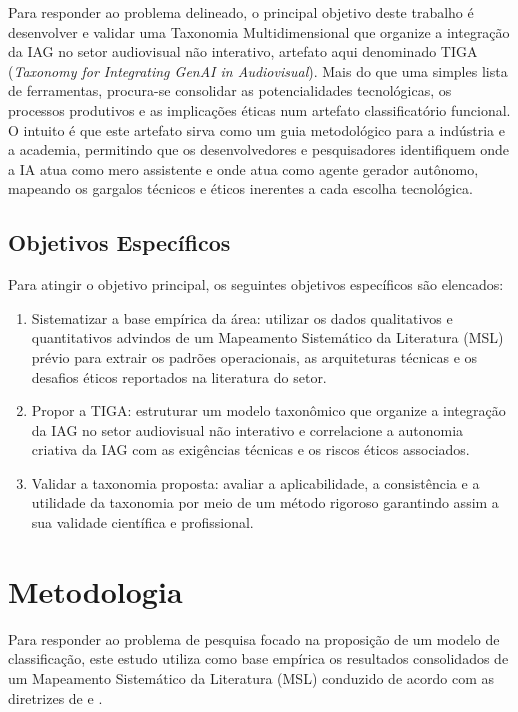 Para responder ao problema delineado, o principal objetivo deste trabalho é desenvolver e validar uma Taxonomia Multidimensional que organize a integração da IAG no setor audiovisual não interativo, artefato aqui denominado TIGA (\textit{Taxonomy for Integrating GenAI in Audiovisual}). Mais do que uma simples lista de ferramentas, procura-se consolidar as potencialidades tecnológicas, os processos produtivos e as implicações éticas num artefato classificatório funcional. O intuito é que este artefato sirva como um guia metodológico para a indústria e a academia, permitindo que os desenvolvedores e pesquisadores identifiquem onde a IA atua como mero assistente e onde atua como agente gerador autônomo, mapeando os gargalos técnicos e éticos inerentes a cada escolha tecnológica.

\subsection{Objetivos Específicos}
\label{subsec:intro:objetivos_especificos}

Para atingir o objetivo principal, os seguintes objetivos específicos são elencados:

\begin{enumerate}
    \item Sistematizar a base empírica da área: utilizar os dados qualitativos e quantitativos advindos de um Mapeamento Sistemático da Literatura (MSL) prévio \citep{RothAleo2026} para extrair os padrões operacionais, as arquiteturas técnicas e os desafios éticos reportados na literatura do setor.
    
    \item Propor a TIGA: estruturar um modelo taxonômico que organize a integração da IAG no setor audiovisual não interativo e correlacione a autonomia criativa da IAG com as exigências técnicas e os riscos éticos associados.
    
    \item Validar a taxonomia proposta: avaliar a aplicabilidade, a consistência e a utilidade da taxonomia por meio de um método rigoroso garantindo assim a sua validade científica e profissional.
\end{enumerate}

\section{Metodologia}
\label{sec:intro:metodologia}

Para responder ao problema de pesquisa focado na proposição de um modelo de classificação, este estudo utiliza como base empírica os resultados consolidados de um Mapeamento Sistemático da Literatura (MSL) conduzido de acordo com as diretrizes de \citet{Kitchenham2007SystematicReviews} e \citet{petersen2008systematic}. 

